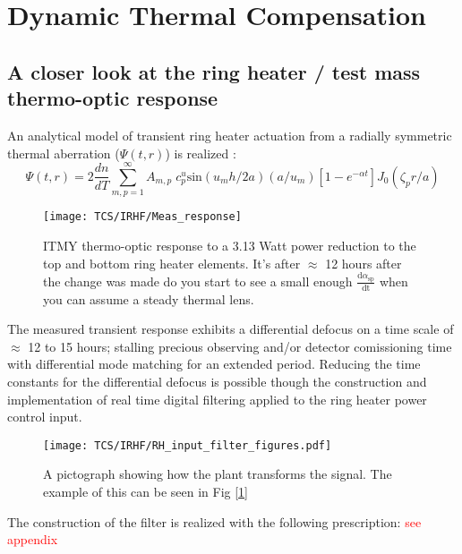 \section{Dynamic Thermal Compensation}
\subsection{A closer look at the ring heater / test mass thermo-optic response}
An analytical model of transient ring heater actuation from a radially symmetric thermal aberration ($\Psi(t,r)$) is realized \cite{Ramette:16}:
\begin{equation}
	\Psi(t,r)=2\frac{dn}{dT} \sum^{\infty}_{m,p = 1} A_{m,p} \; c^{u}_{p} \mathrm{sin}(u_m h /2a) (a/u_m)[1-e^{-\alpha t}] J_0(\zeta_p r/a)
\end{equation}

\begin{figure}[H]
 \texttt{[image: TCS/IRHF/Meas\_response]}
 \caption{ITMY thermo-optic response to a 3.13 Watt power reduction to the top and bottom ring heater elements. It's after $\approx$ 12 hours after the change was made do you start to see a small enough $\frac{\mathrm{d} \alpha_\mathrm{sp}}{\mathrm{dt}}$ when you can assume a steady thermal lens.}
 \label{fig:meas}
\end{figure}

The measured transient response exhibits a differential defocus on a time scale of $\approx$ 12 to 15 hours; stalling precious observing and/or detector comissioning time with differential mode matching for an extended period. Reducing the time constants for the differential defocus is possible though the construction and implementation of real time digital filtering applied to the ring heater power control input.

\begin{figure}[H]
\centering
\texttt{[image: TCS/IRHF/RH\_input\_filter\_figures.pdf]}
\caption{A pictograph showing how the plant transforms the signal. The example of this can be seen in Fig [\ref{fig:meas}]}
\label{fig:justplant}
\end{figure}

The construction of the filter is realized with the following prescription:
\textcolor{red}{see appendix}


